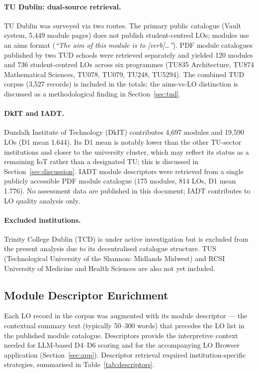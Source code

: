 \documentclass[12pt, a4paper]{article}
\begin{document}
\paragraph{TU Dublin: dual-source retrieval.}
TU Dublin was surveyed via two routes. The primary public catalogue (Vault system,
5,449 module pages) does not publish student-centred LOs; modules use an aims format
(\textit{``The aim of this module is to [verb]\ldots''}). PDF module catalogues
published by two TUD schools were retrieved separately and yielded 120 modules and
736 student-centred LOs across six programmes (TU835 Architecture, TU874 Mathematical
Sciences, TU078, TU079, TU248, TU5294). The combined TUD corpus (3,527 records) is
included in the totals; the aims-vs-LO distinction is discussed as a methodological
finding in Section~\ref{sec:tud}.

\paragraph{DkIT and IADT.}
Dundalk Institute of Technology (DkIT) contributes 4,697 modules and 19,590 LOs
(D1 mean 1.644). Its D1 mean is notably lower than the other TU-sector institutions
and closer to the university cluster, which may reflect its status as a remaining IoT
rather than a designated TU; this is discussed in Section~\ref{sec:discussion}.
IADT module descriptors were retrieved from a single publicly accessible PDF module
catalogue (175 modules, 814 LOs, D1 mean 1.776). No assessment data are published in
this document; IADT contributes to LO quality analysis only.

\paragraph{Excluded institutions.}
Trinity College Dublin (TCD) is under active investigation but is excluded from the
present analysis due to its decentralised catalogue structure. TUS (Technological
University of the Shannon: Midlands Midwest) and RCSI University of Medicine and
Health Sciences are also not yet included.

\subsection{Module Descriptor Enrichment}
\label{sec:descriptors}

Each LO record in the corpus was augmented with its module descriptor --- the
contextual summary text (typically 50--300 words) that precedes the LO list in
the published module catalogue. Descriptors provide the interpretive context
needed for LLM-based D4--D6 scoring and for the accompanying LO Browser
application (Section~\ref{sec:app}). Descriptor retrieval required institution-specific
strategies, summarised in Table~\ref{tab:descriptors}.
\end{document}
